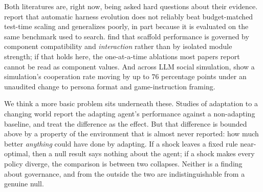 \documentclass[11pt]{article}
\begin{document}
Both literatures are, right now, being asked hard questions about their evidence.
\citet{wang2026rethinking} report that automatic harness evolution does not reliably beat
budget-matched test-time scaling and generalizes poorly, in part because it is evaluated on the same
benchmark used to search. \citet{chen2026agentspec} find that scaffold performance is governed by component compatibility
and \emph{interaction} rather than by isolated module strength; if that holds here, the
one-at-a-time ablations most papers report cannot be read as component values. And across LLM social
simulation, \citet{ye2026trails} show a simulation's cooperation rate moving by up to $76$
percentage points under an unaudited change to persona format and game-instruction framing.

We think a more basic problem sits underneath these. Studies of adaptation to a changing world
report the adapting agent's performance against a non-adapting baseline, and treat the difference as
the effect. But that difference is bounded above by a property of the environment that is almost
never reported: how much better \emph{anything} could have done by adapting. If a shock leaves a
fixed rule near-optimal, then a null result says nothing about the agent; if a shock makes every
policy diverge, the comparison is between two collapses. Neither is a finding about governance, and
from the outside the two are indistinguishable from a genuine null.
\end{document}
